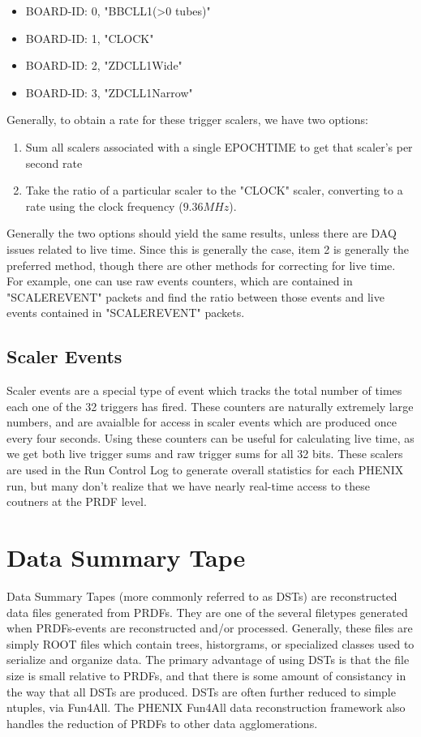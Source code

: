 \begin{itemize}
\item BOARD-ID: 0, "BBCLL1(\textgreater0 tubes)"
\item BOARD-ID: 1, "CLOCK"
\item BOARD-ID: 2, "ZDCLL1Wide"
\item BOARD-ID: 3, "ZDCLL1Narrow"
\end{itemize}

Generally, to obtain a rate for these trigger scalers, we have two options:
\begin{enumerate}
\item Sum all scalers associated with a single EPOCHTIME to get that scaler's per second
rate
\item Take the ratio of a particular scaler to the "CLOCK" scaler, converting to a rate
using the clock frequency ($9.36MHz$).
\end{enumerate}

Generally the two options should yield the same results, unless there are DAQ
issues related to live time. Since this is generally the case, item 2 is
generally the preferred method, though there are other methods for correcting
for live time. For example, one can use raw events counters, which are contained
in "SCALEREVENT" packets and find the ratio between those events and live events
contained in "SCALEREVENT" packets.


\subsection{Scaler Events}
Scaler events are a special type of event which tracks the total number of times
each one of the 32 triggers has fired. These counters are naturally extremely
large numbers, and are avaialble for access in scaler events which are produced
once every four seconds.  Using these counters can be useful for calculating
live time, as we get both live trigger sums and raw trigger sums for all 32
bits. These scalers are used in the Run Control Log to generate overall
statistics for each PHENIX run, but many don't realize that we have nearly
real-time access to these coutners at the PRDF level.

\section{Data Summary Tape}
Data Summary Tapes (more commonly referred to as DSTs) are reconstructed data
files generated from PRDFs. They are one of the several filetypes generated when
PRDFs-events are reconstructed and/or processed. Generally, these files are
simply ROOT files which contain trees, historgrams, or specialized classes used
to serialize and organize data.  The primary advantage of using DSTs is that the
file size is small relative to PRDFs, and that there is some amount of
consistancy in the way that all DSTs are produced. DSTs are often further
reduced to simple ntuples, via Fun4All. The PHENIX Fun4All data reconstruction
framework also handles the reduction of PRDFs to other data agglomerations.

